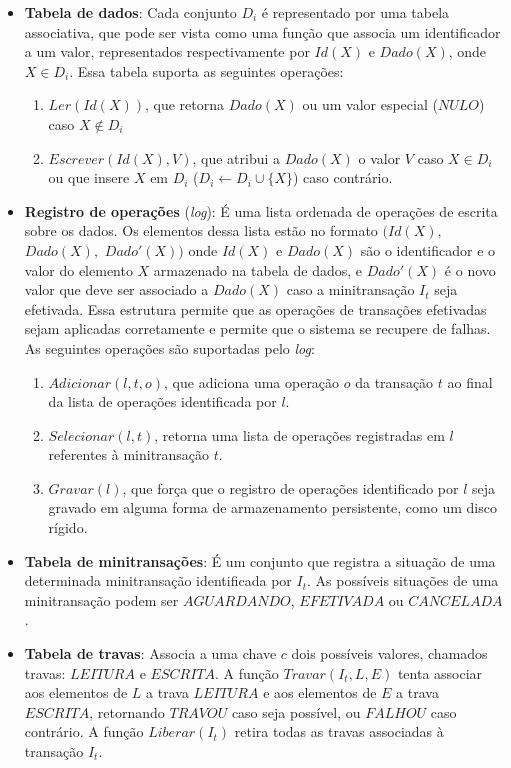 \documentclass[11pt,twoside,a4paper]{book}
\begin{document}
\begin{itemize}

    \item \textbf{Tabela de dados}: Cada conjunto \(D_i\) é representado por uma tabela associativa, que pode ser vista como uma função que associa um identificador a um valor, representados respectivamente por \(Id(X)\) e \(Dado(X)\), onde \(X \in D_i\). Essa tabela suporta as seguintes operações:

    \begin{enumerate}
        \item $Ler(Id(X))$, que retorna $Dado(X)$ ou um valor especial ($NULO$) caso $X \notin D_i$

        \item $Escrever(Id(X), V)$, que atribui a $Dado(X)$ o valor $V$ caso $X \in D_i$ ou que insere $X$ em $D_i$ ($D_i \gets D_i \cup \{X\}$) caso contrário. 
    \end{enumerate}
 
    \item \textbf{Registro de operações} (\emph{log}): É uma lista ordenada de operações de escrita sobre os dados. Os elementos dessa lista estão no formato $(Id(X),$ $Dado(X),$ $Dado'(X))$ onde $Id(X)$ e $Dado(X)$ são o identificador e o valor do elemento $X$ armazenado na tabela de dados, e $Dado'(X)$ é o novo valor que deve ser associado a $Dado(X)$ caso a minitransação $I_t$ seja efetivada. Essa estrutura permite que as operações de transações efetivadas sejam aplicadas corretamente e permite que o sistema se recupere de falhas. As seguintes operações são suportadas pelo \emph{log}:

        \begin{enumerate}
            \item $Adicionar(l, t, o)$, que adiciona uma operação $o$ da transação $t$ ao final da lista de operações identificada por $l$.

            \item $Selecionar(l, t)$, retorna uma lista de operações registradas em $l$ referentes à minitransação $t$.

            \item $Gravar(l)$, que força que o registro de operações identificado por $l$ seja gravado em alguma forma de armazenamento persistente, como um disco rígido.
        \end{enumerate}

    \item \textbf{Tabela de minitransações}: É um conjunto que registra a situação de uma determinada minitransação identificada por $I_t$. As possíveis situações de uma minitransação podem ser $AGUARDANDO$, $EFETIVADA$ ou $CANCELADA$.

    \item \textbf{Tabela de travas}: Associa a uma chave $c$ dois possíveis valores, chamados travas: $LEITURA$ e $ESCRITA$. A função $Travar(I_t, L, E)$ tenta associar aos elementos de $L$ a trava $LEITURA$ e aos elementos de $E$ a trava $ESCRITA$, retornando $TRAVOU$ caso seja possível, ou $FALHOU$ caso contrário. A função $Liberar(I_t)$ retira todas as travas associadas à transação $I_t$.
\end{itemize}
\end{document}
